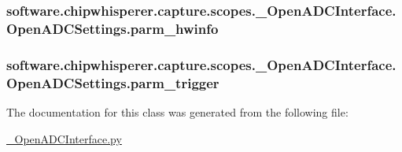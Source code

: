 \subsubsection[{parm\+\_\+hwinfo}]{\setlength{\rightskip}{0pt plus 5cm}software.\+chipwhisperer.\+capture.\+scopes.\+\_\+\+Open\+A\+D\+C\+Interface.\+Open\+A\+D\+C\+Settings.\+parm\+\_\+hwinfo}\label{classsoftware_1_1chipwhisperer_1_1capture_1_1scopes_1_1__OpenADCInterface_1_1OpenADCSettings_a6307ed30f527543132087fdae82fc88f}
\hypertarget{classsoftware_1_1chipwhisperer_1_1capture_1_1scopes_1_1__OpenADCInterface_1_1OpenADCSettings_a30d99ce18223daa15527cb8473ae03f4}{}
\subsubsection[{parm\+\_\+trigger}]{\setlength{\rightskip}{0pt plus 5cm}software.\+chipwhisperer.\+capture.\+scopes.\+\_\+\+Open\+A\+D\+C\+Interface.\+Open\+A\+D\+C\+Settings.\+parm\+\_\+trigger}\label{classsoftware_1_1chipwhisperer_1_1capture_1_1scopes_1_1__OpenADCInterface_1_1OpenADCSettings_a30d99ce18223daa15527cb8473ae03f4}


The documentation for this class was generated from the following file\+:\begin{DoxyCompactItemize}
\item 
\hyperlink{__OpenADCInterface_8py}{\+\_\+\+Open\+A\+D\+C\+Interface.\+py}\end{DoxyCompactItemize}
